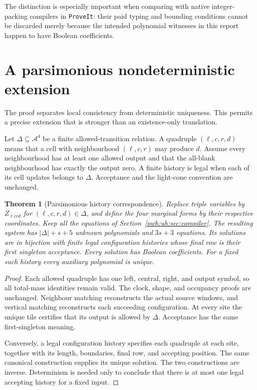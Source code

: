 \documentclass[11pt,letterpaper]{article}
\numberwithin{equation}{section}
\newtheorem{theorem}{Theorem}[section]
\theoremstyle{definition}
\newcommand{\A}{\mathcal A}
\newcommand{\repo}{\texttt{ProveIt}}
\begin{document}
The distinction is especially important when comparing with native
integer-packing compilers in \repo{}: their paid typing and bounding
conditions cannot be discarded merely because the intended polynomial
witnesses in this report happen to have Boolean coefficients.

\section{A parsimonious nondeterministic extension}
\label{pwh:uh:sec:nondeterministic}

The proof separates local consistency from deterministic uniqueness.
This permits a precise extension that is stronger than an existence-only
translation.

Let $\Delta\subseteq\A^4$ be a finite allowed-transition relation.
A quadruple $(\ell,c,r,d)$ means that a cell with neighbourhood
$(\ell,c,r)$ may produce $d$. Assume every neighbourhood has at least one
allowed output and that the all-blank neighbourhood has exactly the output
zero. A finite history is legal when each of its cell updates belongs to
$\Delta$. Acceptance and the light-cone convention are unchanged.

\begin{theorem}[Parsimonious history correspondence]
\label{pwh:uh:thm:nondet}
Replace triple variables by $Z_{\ell c r d}$ for
$(\ell,c,r,d)\in\Delta$, and define the four marginal forms by their
respective coordinates. Keep all the equations of
Section~\ref{pwh:uh:sec:compiler}. The resulting system has
$|\Delta|+s+5$ unknown polynomials and $3s+3$ equations. Its solutions
are in bijection with finite legal configuration histories whose final
row is their first singleton acceptance. Every solution has Boolean
coefficients. For a fixed such history every auxiliary polynomial is
unique.
\end{theorem}

\begin{proof}
Each allowed quadruple has one left, central, right, and output symbol,
so all total-mass identities remain valid. The clock, shape, and occupancy
proofs are unchanged. Neighbour matching reconstructs the actual source
windows, and vertical matching reconstructs each succeeding configuration.
At every site the unique tile certifies that its output is allowed by
$\Delta$. Acceptance has the same first-singleton meaning.

Conversely, a legal configuration history specifies each quadruple at
each site, together with its length, boundaries, final row, and accepting
position. The same canonical construction supplies its unique solution.
The two constructions are inverse. Determinism is needed only to conclude
that there is at most one legal accepting history for a fixed input.
\end{proof}
\end{document}
